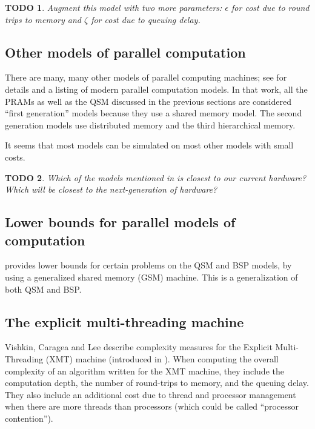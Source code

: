 \documentclass{article}
\newtheorem{todo}{TODO}
\begin{document}
\begin{todo}
  Augment this model with two more parameters: $\epsilon$ for cost due to round trips to memory and $\zeta$ for cost due to queuing delay.
\end{todo}

\subsection{Other models of parallel computation}

There are many, many other models of parallel computing machines; see \cite{zcsm07} for details and a listing of modern parallel computation models.
In that work, all the PRAMs as well as the QSM discussed in the previous sections are considered ``first generation'' models because they use a shared memory model.
The second generation models use distributed memory and the third hierarchical memory.

It seems that most models can be simulated on most other models with small costs.

\begin{todo}
  Which of the models mentioned in \cite{zcsm07} is closest to our current hardware?
  Which will be closest to the next-generation of hardware?
\end{todo}

\subsection{Lower bounds for parallel models of computation}

\cite{mr98} provides lower bounds for certain problems on the QSM and BSP models, by using a generalized shared memory (GSM) machine.
This is a generalization of both QSM and BSP.

\subsection{The explicit multi-threading machine}
Vishkin, Caragea and Lee \cite{vcl06} describe complexity measures for the Explicit Multi-Threading (XMT) machine (introduced in \cite{vdbn98}).
When computing the overall complexity of an algorithm written for the XMT machine, they include the computation depth, the number of round-trips to memory, and the queuing delay.
They also include an additional cost due to thread and processor management when there are more threads than processors (which could be called ``processor contention'').
\end{document}

